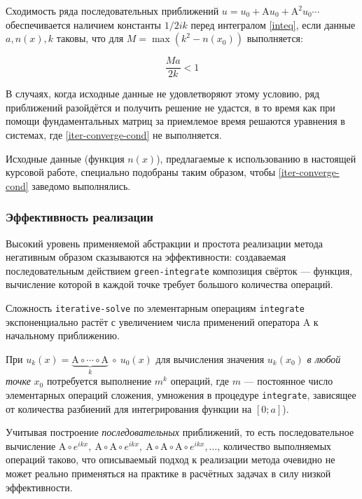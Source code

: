 \documentclass{article}
\newcommand{\procname}[1]{\texttt{#1}}
\providecommand{\op}[1]{\mathrm{#1}}
\providecommand{\comp}{\circ}
\numberwithin{equation}{section}
\begin{document}
Сходимость ряда последовательных приближений $u = u_0 + \op{A} u_0 +
\op{A}^2 u_0 \dotsb$ обеспечивается наличием константы $1/2ik$
перед интегралом \eqref{inteq}, если данные $a, n(x), k$ таковы, что
для $M=\max(k^2-n(x_0))$ выполняется:

\begin{equation}\label{iter-converge-cond}
  \frac{Ma}{2k}<1
\end{equation}

В случаях, когда исходные данные не удовлетворяют этому условию, ряд
приближений разойдётся и получить решение не удастся, в то время как
при помощи фундаментальных матриц за приемлемое время решаются
уравнения в системах, где \eqref{iter-converge-cond} не выполняется.

Исходные данные (функция $n(x)$), предлагаемые к использованию в
настоящей курсовой работе, специально подобраны таким образом, чтобы
\eqref{iter-converge-cond} заведомо выполнялись.

\subsubsection{Эффективность реализации}

Высокий уровень применяемой абстракции и простота реализации метода
негативным образом сказываются на эффективности: создаваемая
последовательным действием \procname{green-integrate} композиция
свёрток — функция, вычисление которой в каждой точке требует большого
количества операций.

Сложность \procname{iterative-solve} по элементарным операциям
\procname{integrate} экспоненциально растёт с увеличением числа
применений оператора $\op{A}$ к начальному приближению.

При $u_k(x) = \underbrace{\op{A} \comp \dotsb \comp \op{A}}_k\ \comp\ u_0(x)$ для
вычисления значения $u_k(x_0)$ \emph{в любой точке} $x_0$ потребуется
выполнение $m^k$ операций, где $m$ — постоянное число элементарных
операций сложения, умножения в процедуре \procname{integrate},
зависящее от количества разбиений для интегрирования функции на $[0;
a]$).

Учитывая построение \emph{последовательных} приближений, то есть
последовательное вычисление $\op{A} \comp e^{ikx},\ \op{A} \comp \op{A} \comp
e^{ikx},\ \op{A} \comp \op{A} \comp \op{A} \comp e^{ikx},\dotsc$, количество
выполняемых операций таково, что описываемый подход к реализации
метода очевидно не может реально применяться на практике в расчётных
задачах в силу низкой эффективности.
\end{document}
